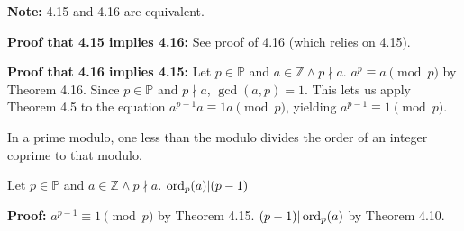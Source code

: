 \item \textbf{Note:} 4.15 and 4.16 are equivalent.

\textbf{Proof that 4.15 implies 4.16:} See proof of 4.16 (which relies on 4.15).

\textbf{Proof that 4.16 implies 4.15:} Let \(p \in \mathbb P\) and \(a \in \mathbb Z \wedge p \nmid a\). \(a^p \equiv a \pmod p\) by Theorem 4.16. Since \(p \in \mathbb P\) and \(p \nmid a\), \(\gcd(a, p) = 1\). This lets us apply Theorem 4.5 to the equation \(a^{p-1} a \equiv 1 a \pmod p\), yielding \(a^{p-1} \equiv 1 \pmod p\).

\item In a prime modulo, one less than the modulo divides the order of an integer coprime to that modulo.

Let \(p \in \mathbb P\) and \(a \in \mathbb Z \wedge p \nmid a\). \(\operatorname{ord}_p(a) | (p-1)\)

\textbf{Proof:} \(a^{p-1} \equiv 1 \pmod p\) by Theorem 4.15. \((p-1)|\operatorname{ord}_p(a)\) by Theorem 4.10.


